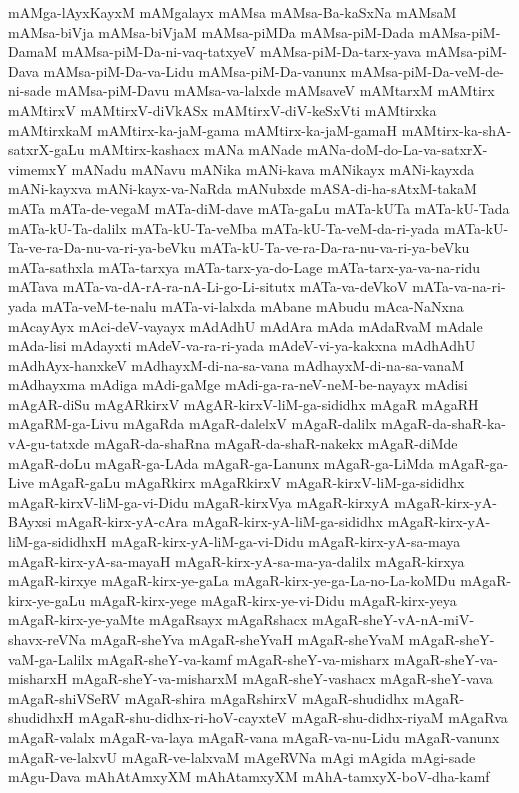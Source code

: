 {mAMga-lAyxKayxM
mAMgalayx
mAMsa
mAMsa-Ba-kaSxNa
mAMsaM
mAMsa-biVja
mAMsa-biVjaM
mAMsa-piMDa
mAMsa-piM-Dada
mAMsa-piM-DamaM
mAMsa-piM-Da-ni-vaq-tatxyeV
mAMsa-piM-Da-tarx-yava
mAMsa-piM-Dava
mAMsa-piM-Da-va-Lidu
mAMsa-piM-Da-vanunx
mAMsa-piM-Da-veM-de-ni-sade
mAMsa-piM-Davu
mAMsa-va-lalxde
mAMsaveV
mAMtarxM
mAMtirx
mAMtirxV
mAMtirxV-diVkASx
mAMtirxV-diV-keSxVti
mAMtirxka
mAMtirxkaM
mAMtirx-ka-jaM-gama
mAMtirx-ka-jaM-gamaH
mAMtirx-ka-shA-satxrX-gaLu
mAMtirx-kashacx
mANa
mANade
mANa-doM-do-La-va-satxrX-vimemxY
mANadu
mANavu
mANika
mANi-kava
mANikayx
mANi-kayxda
mANi-kayxva
mANi-kayx-va-NaRda
mANubxde
mASA-di-ha-sAtxM-takaM
mATa
mATa-de-vegaM
mATa-diM-dave
mATa-gaLu
mATa-kUTa
mATa-kU-Tada
mATa-kU-Ta-dalilx
mATa-kU-Ta-veMba
mATa-kU-Ta-veM-da-ri-yada
mATa-kU-Ta-ve-ra-Da-nu-va-ri-ya-beVku
mATa-kU-Ta-ve-ra-Da-ra-nu-va-ri-ya-beVku
mATa-sathxla
mATa-tarxya
mATa-tarx-ya-do-Lage
mATa-tarx-ya-va-na-ridu
mATava
mATa-va-dA-rA-ra-nA-Li-go-Li-situtx
mATa-va-deVkoV
mATa-va-na-ri-yada
mATa-veM-te-nalu
mATa-vi-lalxda
mAbane
mAbudu
mAca-NaNxna
mAcayAyx
mAci-deV-vayayx
mAdAdhU
mAdAra
mAda
mAdaRvaM
mAdale
mAda-lisi
mAdayxti
mAdeV-va-ra-ri-yada
mAdeV-vi-ya-kakxna
mAdhAdhU
mAdhAyx-hanxkeV
mAdhayxM-di-na-sa-vana
mAdhayxM-di-na-sa-vanaM
mAdhayxma
mAdiga
mAdi-gaMge
mAdi-ga-ra-neV-neM-be-nayayx
mAdisi
mAgAR-diSu
mAgARkirxV
mAgAR-kirxV-liM-ga-sididhx
mAgaR
mAgaRH
mAgaRM-ga-Livu
mAgaRda
mAgaR-dalelxV
mAgaR-dalilx
mAgaR-da-shaR-ka-vA-gu-tatxde
mAgaR-da-shaRna
mAgaR-da-shaR-nakekx
mAgaR-diMde
mAgaR-doLu
mAgaR-ga-LAda
mAgaR-ga-Lanunx
mAgaR-ga-LiMda
mAgaR-ga-Live
mAgaR-gaLu
mAgaRkirx
mAgaRkirxV
mAgaR-kirxV-liM-ga-sididhx
mAgaR-kirxV-liM-ga-vi-Didu
mAgaR-kirxVya
mAgaR-kirxyA
mAgaR-kirx-yA-BAyxsi
mAgaR-kirx-yA-cAra
mAgaR-kirx-yA-liM-ga-sididhx
mAgaR-kirx-yA-liM-ga-sididhxH
mAgaR-kirx-yA-liM-ga-vi-Didu
mAgaR-kirx-yA-sa-maya
mAgaR-kirx-yA-sa-mayaH
mAgaR-kirx-yA-sa-ma-ya-dalilx
mAgaR-kirxya
mAgaR-kirxye
mAgaR-kirx-ye-gaLa
mAgaR-kirx-ye-ga-La-no-La-koMDu
mAgaR-kirx-ye-gaLu
mAgaR-kirx-yege
mAgaR-kirx-ye-vi-Didu
mAgaR-kirx-yeya
mAgaR-kirx-ye-yaMte
mAgaRsayx
mAgaRshacx
mAgaR-sheY-vA-nA-miV-shavx-reVNa
mAgaR-sheYva
mAgaR-sheYvaH
mAgaR-sheYvaM
mAgaR-sheY-vaM-ga-Lalilx
mAgaR-sheY-va-kamf
mAgaR-sheY-va-misharx
mAgaR-sheY-va-misharxH
mAgaR-sheY-va-misharxM
mAgaR-sheY-vashacx
mAgaR-sheY-vava
mAgaR-shiVSeRV
mAgaR-shira
mAgaRshirxV
mAgaR-shudidhx
mAgaR-shudidhxH
mAgaR-shu-didhx-ri-hoV-cayxteV
mAgaR-shu-didhx-riyaM
mAgaRva
mAgaR-valalx
mAgaR-va-laya
mAgaR-vana
mAgaR-va-nu-Lidu
mAgaR-vanunx
mAgaR-ve-lalxvU
mAgaR-ve-lalxvaM
mAgeRVNa
mAgi
mAgida
mAgi-sade
mAgu-Dava
mAhAtAmxyXM
mAhAtamxyXM
mAhA-tamxyX-boV-dha-kamf
}
